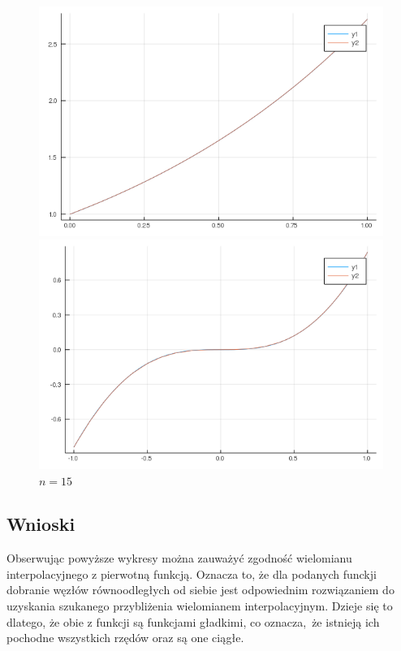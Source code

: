 \documentclass[11pt, a4paper]{article}
\begin{document}
\begin{figure}[H]
        \begin{minipage}{0.5\textwidth}
            \caption{$n=15$}
            \centering
            \includegraphics[width=\linewidth]{plot-5_a_n15}
        \end{minipage}
        \begin{minipage}{0.5\textwidth}
            \caption{$n=15$}
            \centering
            \includegraphics[width=\linewidth]{plot-5_b_n15}
        \end{minipage}
    \end{figure}
    \subsection{Wnioski}
    Obserwując powyższe wykresy można zauważyć zgodność wielomianu interpolacyjnego z pierwotną funkcją. Oznacza to, że dla podanych funckji dobranie węzłów równoodległych od siebie jest odpowiednim rozwiązaniem do uzyskania szukanego przybliżenia wielomianem interpolacyjnym. Dzieje się to dlatego, że obie z funkcji są funkcjami gładkimi, co oznacza, że istnieją ich pochodne wszystkich rzędów oraz są one ciągłe. 
\end{document}
